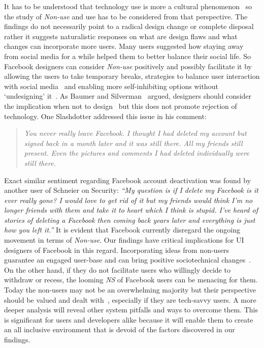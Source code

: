 It has to be understood that technology use is more a cultural phenomenon~\cite{satchell2009beyond} so the study of \emph{Non-use} and use has to be considered from that perspective. The findings do not necessarily point to a radical design change or complete disposal rather it suggests naturalistic responses on what are design flaws and what changes can incorporate more users. Many users suggested how staying away from social media for a while helped them to better balance their social life. So Facebook designers can consider \emph{Non-use} positively and possibly facilitate it by allowing the users to take temporary breaks, strategies to balance user interaction with social media~\cite{schoenebeck2014giving} and enabling more self-inhibiting options without `undesigning' it~\cite{pierce2012undesigning}. As Baumer and Silverman~\cite{baumer2011implication} argued, designers should consider the implication when not to design~\cite{dourish2006implications} but this does not promote rejection of technology. One Slashdotter addressed this issue in his comment:
\begin{quote}
         \textit{You never really leave Facebook. I thought I had deleted my account but signed back in a month later and it was still there. All my friends still present. Even the pictures and comments I had deleted individually were still there.}
    \end{quote}
Exact similar sentiment regarding Facebook account deactivation was found by another user of Schneier on Security: \textit{``My question is if I delete my Facebook is it ever really gone? I would love to get rid of it but my friends would think I'm no longer friends with them and take it to heart which I think is stupid. I've heard of stories of deleting a Facebook then coming back years later and everything is just how you left it.''} It is evident that Facebook currently disregard the ongoing movement in terms of \emph{Non-use}. Our findings have critical implications for UI designers of Facebook in this regard. Incorporating ideas from non-users guarantee an engaged user-base and can bring positive sociotechnical changes~\cite{baumer2013limiting}. On the other hand, if they do not facilitate users who willingly decide to withdraw or recess, the looming \emph{NS} of Facebook users can be menacing for them. Today the non-users may not be an overwhelming majority but their perspective should be valued and dealt with~\cite{wyatt2003non, satchell2009beyond}, especially if they are tech-savvy users. A more deeper analysis will reveal other system pitfalls and ways to overcome them. This is significant for users and developers alike because it will enable them to create an all inclusive environment that is devoid of the factors discovered in our findings.